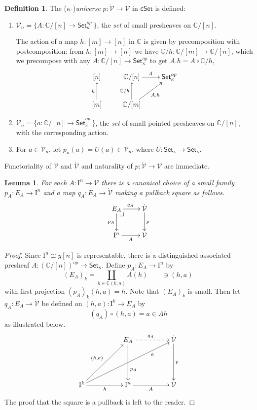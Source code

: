 \documentclass[11pt]{article}
\makeatletter
\newcommand{\C}{\ensuremath{\mathbb{C}}}
\newcommand{\Set}{\ensuremath{\mathsf{Set}}}
\newcommand{\cSet}{\ensuremath{\mathsf{cSet}}}
\newcommand{\pbcorner}[1][dr]{\save*!/#1-1.2pc/#1:(-1,1)@^{|-}\restore}
\newcommand{\ra}{\ensuremath{\rightarrow}}
\newcommand{\I}{\ensuremath{\mathrm{I}}}
\newcommand{\V}{\ensuremath{\mathcal{V}}}
\newcommand{\VV}{\ensuremath{\dot{\mathcal{V}}}}
\newtheorem{lemma}[theorem]{Lemma}
\theoremstyle{remark}
\theoremstyle{definition}
\newtheorem{definition}[theorem]{Definition}
\makeatother
\begin{document}
\begin{definition}
The ($\kappa$-)\emph{universe} $p : \VV \to \V$ in $\cSet$ is defined:
\begin{enumerate}

\item $\V_n = \{ A: \C/[n] \to \Set^{op}_\kappa\ \}$, the \emph{set} of small presheaves on $\C/[n]$.  

The action of a map $h : [m] \ra [n]$ in  $\C$  is given by precomposition with postcomposition: from  $h : [m] \ra [n]$ we have  $\C/h : \C/[m] \ra \C/[n]$, which we precompose with any $A: \C/[n]\to \Set_\kappa^{op} $ to get $A.h = A\circ \C/h$,
\begin{equation}\label{diagram:U1}
\xymatrix{
[n] & \C/[n] \ar[r]^{A} & \Set_\kappa^{op} \\
[m] \ar[u]^{h} & \C/[m] \ar[u]^{\C/h}  \ar[ru]_{A.h} &
}
\end{equation}

\item $\VV_n = \{ a: \C/[n] \to \dot{\Set}^{op}_\kappa\ \}$, the \emph{set} of small pointed presheaves on $\C/[n]$, with the corresponding action.

\item For $a \in \VV_n$, let $p_n (a) = U(a) \in \V_n$, where $U : \dot{\Set_\kappa} \to {\Set_\kappa}$.
\end{enumerate}
\end{definition}
Functoriality of $\V$ and $\VV$ and naturality of $p: \VV\ra\V$ are immediate. 

\begin{lemma}
For each $A : \I^n \ra \V$ there is a canonical choice of a small family $p_A : E_A\ra \I^n$ and a map $q_A: E_A \ra\VV$ making a pullback square as follows.
\begin{equation}\label{diagram:U2}
\xymatrix{
E_A \ar[d]_{p_A} \ar[r]^{q_A}  \pbcorner& \VV\ar[d]^{p}  \\
\I^n \ar[r]_{A} & \V
}
\end{equation}
\end{lemma}
%
\begin{proof}
Since $\I^n \cong y[n]$ is representable, there is a distinguished associated presheaf $A : (\C/[n])^{op} \ra \Set_\kappa$. Define $p_A : E_A \ra \I^n$ by
\[
(E_A)_k = \coprod_{h\in \C(k,n)} A(h) \qquad \ni (h, a)\,
\]
with first projection $(p_A)_k(h,a) = h$. Note that $(E_A)_k$ is small.
Then let $q_A:E_A \ra\VV$ be defined on $(h,a): \I^k \ra E_A$ by 
\[
(q_A)\circ(h, a) = a \in Ah
\]
as illustrated below.
\begin{equation}\label{diagram:U3}
\xymatrix@=5em{
& E_A \ar[d]^>>>>>>{p_A} \ar@{..>}[r]^{q_A} & \VV\ar[d]^{p}  \\
\I^k \ar[r]_{h} \ar[ru]^{(h,a)}\ar[rru]_>>>>>>>>>>>{a} & \I^n \ar[r]_{A} & \V
}
\end{equation}
The proof that the square is a pullback is left to the reader.
\end{proof}
\end{document}
